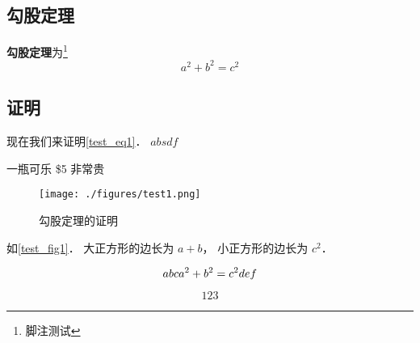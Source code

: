 

\subsection{勾股定理}
\textbf{勾股定理}为\footnote{脚注测试}
\begin{equation}\label{test_eq1}
a^2 + b^2 = c^2
\end{equation}

\subsection{证明}
现在我们来证明\autoref{test_eq1}． $absdf$

一瓶可乐 \$5 非常贵

\begin{figure}[ht]
\centering
\texttt{[image: ./figures/test1.png]}
\caption{勾股定理的证明} \label{test_fig1}
\end{figure}

如\autoref{test_fig1}． 大正方形的边长为 $a + b$， 小正方形的边长为 $c^2$． 

\begin{equation}
abc\\
a^2 + b^2 = c^2\\
def
\end{equation}

\begin{equation}
123
\end{equation}
